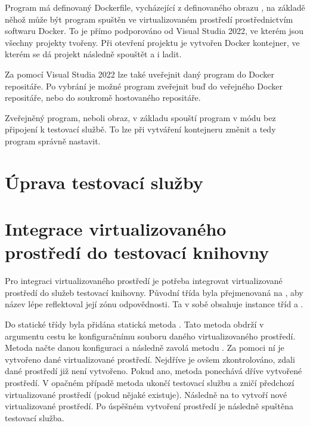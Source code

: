Program má definovaný Dockerfile, vycházející z definovaného obrazu , na základě něhož může být program spuštěn ve virtualizovaném prostředí prostřednictvím softwaru Docker. To je přímo podporováno od Visual Studia 2022\cite{vs2022}, ve kterém jsou všechny projekty tvořeny. Při otevření projektu je vytvořen Docker kontejner, ve kterém se dá projekt následně spouštět a i ladit.

Za pomocí Visual Studia 2022 lze také uveřejnit daný program do Docker repositáře. Po vybrání  je možné program zveřejnit buď do veřejného Docker repositáře, nebo do soukromě hostovaného repositáře.

Zveřejněný program, neboli obraz, v základu spouští program v módu bez připojení k testovací službě. To lze při vytváření kontejneru změnit a tedy program správně nastavit. 

\section{Úprava testovací služby}


\section{Integrace virtualizovaného prostředí do testovací knihovny}

Pro integraci virtualizovaného prostředí je potřeba integrovat virtualizované prostředí do služeb testovací knihovny. Původní třída  byla přejmenovaná na , aby název lépe reflektoval její zónu odpovědnosti. Ta v sobě obsahuje instance tříd  a .

Do statické třídy  byla přidána statická metoda . Tato metoda obdrží v argumentu cestu ke konfiguračnímu souboru daného virtualizovaného prostředí. Metoda načte danou konfiguraci a následně zavolá metodu . Za pomoci ní je vytvořeno dané virtualizované prostředí. Nejdříve je ovšem zkontrolováno, zdali dané prostředí již není vytvořeno. Pokud ano, metoda ponechává dříve vytvořené prostředí. V opačném případě metoda ukončí testovací službu a zničí předchozí virtualizované prostředí (pokud nějaké existuje). Následně na to vytvoří nové virtualizované prostředí. Po úspěšném vytvoření prostředí je následně spuštěna testovací služba.

